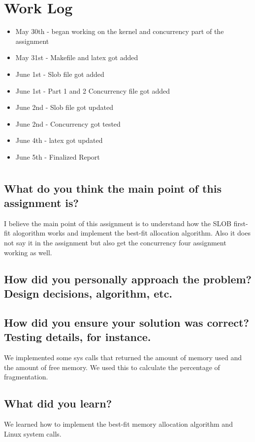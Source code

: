 \documentclass[draftclsnofoot,onecolumn,10pt,compsoc]{IEEEtran}
\begin{document}
\section{Work Log}
\begin{itemize}
	\item May 30th - began working on the kernel and concurrency part of the assignment
	\item May 31st - Makefile and latex got added
	\item June 1st - Slob file got added
	\item June 1st - Part 1 and 2 Concurrency file got added
	\item June 2nd - Slob file got updated
	\item June 2nd - Concurrency got tested
	\item June 4th - latex got updated
	\item June 5th - Finalized Report
	
	
	
	
	
\end{itemize}
\section{}
\subsection{What do you think the main point of this assignment is?}
 I believe the main point of this assignment is to understand how the SLOB first-fit alogorithm works and implement the best-fit allocation algorithm.  Also it does not say it in the assignment but also get the concurrency four assignment working as well.  
\subsection{How did you personally approach the problem? Design decisions, algorithm, etc.}

\subsection{How did you ensure your solution was correct? Testing details, for instance.}
We implemented some sys calls that returned the amount of memory used and the amount of free memory. We used this to calculate the percentage of fragmentation.
\subsection{What did you learn?}
We learned how to implement the best-fit memory allocation algorithm and Linux system calls.
\end{document}
